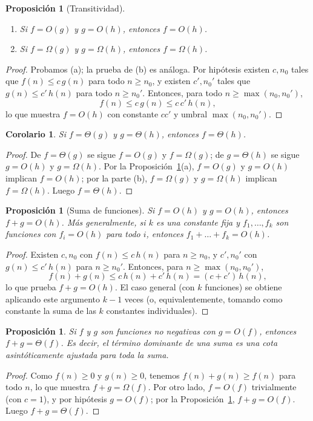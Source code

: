 \documentclass[12pt, spanish, oneside, openany]{book}
\theoremstyle{uprightplain}
\newtheorem{proposicion}[teorema]{Proposición}
\newtheorem{corolario}[teorema]{Corolario}
\theoremstyle{definition}
\theoremstyle{remark}
\theoremstyle{definition}
\begin{document}
\begin{proposicion}[Transitividad] \mbox{}
\label{prop:transitividad}
\begin{enumerate}[label=(\alph*)]
    \item Si $f=O(g)$ y $g=O(h)$, entonces $f=O(h)$.
    \item Si $f=\Omega(g)$ y $g=\Omega(h)$, entonces $f=\Omega(h)$.
\end{enumerate}
\end{proposicion}
\begin{proof}
Probamos (a); la prueba de (b) es análoga. Por hipótesis existen $c,n_0$ tales que $f(n)\le c\,g(n)$ para todo $n\ge n_0$, y existen $c',n_0'$ tales que $g(n)\le c'\,h(n)$ para todo $n\ge n_0'$. Entonces, para todo $n\ge\max(n_0,n_0')$,
\[
f(n) \le c\,g(n) \le c\,c'\,h(n),
\]
lo que muestra $f=O(h)$ con constante $cc'$ y umbral $\max(n_0,n_0')$.
\end{proof}

\begin{corolario}
\label{cor:transitividad-theta}
Si $f=\Theta(g)$ y $g=\Theta(h)$, entonces $f=\Theta(h)$.
\end{corolario}
\begin{proof}
De $f=\Theta(g)$ se sigue $f=O(g)$ y $f=\Omega(g)$; de $g=\Theta(h)$ se sigue $g=O(h)$ y $g=\Omega(h)$. Por la Proposición~\ref{prop:transitividad}(a), $f=O(g)$ y $g=O(h)$ implican $f=O(h)$; por la parte (b), $f=\Omega(g)$ y $g=\Omega(h)$ implican $f=\Omega(h)$. Luego $f=\Theta(h)$.
\end{proof}

\begin{proposicion}[Suma de funciones]
\label{prop:suma-O}
Si $f=O(h)$ y $g=O(h)$, entonces $f+g=O(h)$. Más generalmente, si $k$ es una constante fija y $f_1,\dots,f_k$ son funciones con $f_i=O(h)$ para todo $i$, entonces $f_1+\dots+f_k=O(h)$.
\end{proposicion}
\begin{proof}
Existen $c,n_0$ con $f(n)\le c\,h(n)$ para $n\ge n_0$, y $c',n_0'$ con $g(n)\le c'\,h(n)$ para $n\ge n_0'$. Entonces, para $n\ge\max(n_0,n_0')$,
\[
f(n)+g(n) \le c\,h(n)+c'\,h(n) = (c+c')\,h(n),
\]
lo que prueba $f+g=O(h)$. El caso general (con $k$ funciones) se obtiene aplicando este argumento $k-1$ veces (o, equivalentemente, tomando como constante la suma de las $k$ constantes individuales).
\end{proof}

\begin{proposicion}
\label{prop:dominante}
Si $f$ y $g$ son funciones no negativas con $g=O(f)$, entonces $f+g=\Theta(f)$. Es decir, el término dominante de una suma es una cota asintóticamente ajustada para toda la suma.
\end{proposicion}
\begin{proof}
Como $f(n)\ge 0$ y $g(n)\ge 0$, tenemos $f(n)+g(n)\ge f(n)$ para todo $n$, lo que muestra $f+g=\Omega(f)$. Por otro lado, $f=O(f)$ trivialmente (con $c=1$), y por hipótesis $g=O(f)$; por la Proposición~\ref{prop:suma-O}, $f+g=O(f)$. Luego $f+g=\Theta(f)$.
\end{proof}
\end{document}

